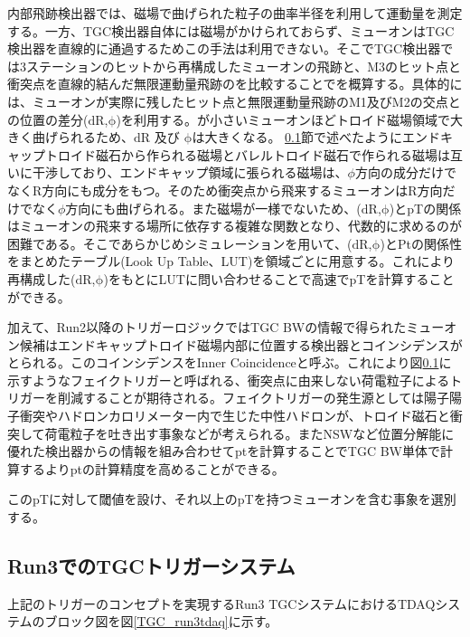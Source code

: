 内部飛跡検出器では、磁場で曲げられた粒子の曲率半径を利用して運動量を測定する。一方、TGC検出器自体には磁場がかけられておらず、ミューオンはTGC検出器を直線的に通過するためこの手法は利用できない。そこでTGC検出器では3ステーションのヒットから再構成したミューオンの飛跡と、M3のヒット点と衝突点を直線的結んだ無限運動量飛跡のを比較することで\pt を概算する。具体的には、ミューオンが実際に残したヒット点と無限運動量飛跡のM1及びM2の交点との位置の差分($\mathrm{dR}$,$\mathrm{\phi}$)を利用する。\pt が小さいミューオンほどトロイド磁場領域で大きく曲げられるため、$\mathrm{dR}$ 及び $\mathrm{\phi}$は大きくなる。
\ref{}節で述べたようにエンドキャップトロイド磁石から作られる磁場とバレルトロイド磁石で作られる磁場は互いに干渉しており、エンドキャップ領域に張られる磁場は、$\phi$方向の成分だけでなくR方向にも成分をもつ。そのため衝突点から飛来するミューオンはR方向だけでなく$\phi$方向にも曲げられる。また磁場が一様でないため、($\mathrm{dR}$,$\mathrm{\phi}$)とpTの関係はミューオンの飛来する場所に依存する複雑な関数となり、代数的に求めるのが困難である。そこであらかじめシミュレーションを用いて、($\mathrm{dR}$,$\mathrm{\phi}$)とPtの関係性をまとめたテーブル(Look Up Table、LUT)を領域ごとに用意する。これにより再構成した($\mathrm{dR}$,$\mathrm{\phi}$)をもとにLUTに問い合わせることで高速でpTを計算することができる。

加えて、Run2以降のトリガーロジックではTGC BWの情報で得られたミューオン候補はエンドキャップトロイド磁場内部に位置する検出器とコインシデンスがとられる。このコインシデンスをInner Coincidenceと呼ぶ。これにより図\ref{}に示すようなフェイクトリガーと呼ばれる、衝突点に由来しない荷電粒子によるトリガーを削減することが期待される。フェイクトリガーの発生源としては陽子陽子衝突やハドロンカロリメーター内で生じた中性ハドロンが、トロイド磁石と衝突して荷電粒子を吐き出す事象などが考えられる。またNSWなど位置分解能に優れた検出器からの情報を組み合わせてptを計算することでTGC BW単体で計算するよりptの計算精度を高めることができる。

このpTに対して閾値を設け、それ以上のpTを持つミューオンを含む事象を選別する。

    \subsection{Run3でのTGCトリガーシステム}
上記のトリガーのコンセプトを実現するRun3 TGCシステムにおけるTDAQシステムのブロック図を図\ref{TGC_run3tdaq}に示す。

